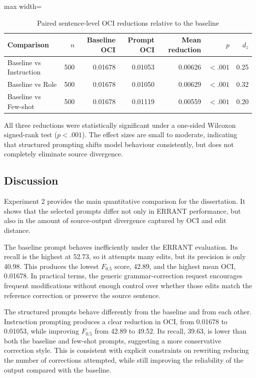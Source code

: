 \begin{table}[htbp]
    \centering
    \caption{Paired sentence-level OCI reductions relative to the baseline}
    \label{tab:exp2_paired_oci_tests}
    \renewcommand{\arraystretch}{1.15}
    \begin{adjustbox}{max width=\textwidth}
    \begin{tabular}{lrrrrrr}
        \toprule
        \textbf{Comparison} & \textbf{$n$} & \textbf{Baseline OCI} & \textbf{Prompt OCI} & \textbf{Mean reduction} & \textbf{$p$} & \textbf{$d_z$} \\
        \midrule
        Baseline vs Instruction & 500 & 0.01678 & 0.01053 & 0.00626 & $< .001$ & 0.25 \\
        Baseline vs Role        & 500 & 0.01678 & 0.01050 & 0.00629 & $< .001$ & 0.32 \\
        Baseline vs Few-shot    & 500 & 0.01678 & 0.01119 & 0.00559 & $< .001$ & 0.20 \\
        \bottomrule
    \end{tabular}
    \end{adjustbox}
\end{table}

All three reductions were statistically significant under a one-sided Wilcoxon signed-rank test ($p < .001$). The effect sizes are small to moderate, indicating that structured prompting shifts model behaviour consistently, but does not completely eliminate source divergence.

\subsection{Discussion}

Experiment 2 provides the main quantitative comparison for the dissertation. It shows that the selected prompts differ not only in ERRANT performance, but also in the amount of source-output divergence captured by OCI and edit distance.

The baseline prompt behaves inefficiently under the ERRANT evaluation. Its recall is the highest at 52.73, so it attempts many edits, but its precision is only 40.98. This produces the lowest $F_{0.5}$ score, 42.89, and the highest mean OCI, 0.01678. In practical terms, the generic grammar-correction request encourages frequent modifications without enough control over whether those edits match the reference correction or preserve the source sentence.

The structured prompts behave differently from the baseline and from each other. Instruction prompting produces a clear reduction in OCI, from 0.01678 to 0.01053, while improving $F_{0.5}$ from 42.89 to 49.52. Its recall, 39.63, is lower than both the baseline and few-shot prompts, suggesting a more conservative correction style. This is consistent with explicit constraints on rewriting reducing the number of corrections attempted, while still improving the reliability of the output compared with the baseline.

